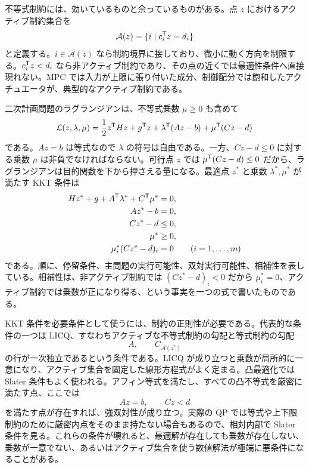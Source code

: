 不等式制約には、効いているものと余っているものがある。点 $z$ におけるアクティブ制約集合を
\begin{equation}
  \mathcal{A}(z)=\{i\mid c_i^{\mathsf{T}} z=d_i\}
\end{equation}
と定義する。$i\in\mathcal{A}(z)$ なら制約境界に接しており、微小に動く方向を制限する。$c_i^{\mathsf{T}} z<d_i$ なら非アクティブ制約であり、その点の近くでは最適性条件へ直接現れない。MPC では入力が上限に張り付いた成分、制御配分では飽和したアクチュエータが、典型的なアクティブ制約である。

二次計画問題のラグランジアンは、不等式乗数 $\mu\ge0$ も含めて
\begin{equation}
  \mathcal{L}(z,\lambda,\mu)
  =\frac{1}{2}z^{\mathsf{T}} Hz+g^{\mathsf{T}} z
  +\lambda^{\mathsf{T}}(Az-b)+\mu^{\mathsf{T}}(Cz-d)
\end{equation}
である。$Az=b$ は等式なので $\lambda$ の符号は自由である。一方、$Cz-d\le0$ に対する乗数 $\mu$ は非負でなければならない。可行点 $z$ では $\mu^{\mathsf{T}}(Cz-d)\le0$ だから、ラグランジアンは目的関数を下から押さえる量になる。最適点 $z^*$ と乗数 $\lambda^*,\mu^*$ が満たす KKT 条件は
\begin{align}
  Hz^*+g+A^{\mathsf{T}}\lambda^*+C^{\mathsf{T}}\mu^*&=0,\\
  Az^*-b&=0,\\
  Cz^*-d&\le0,\\
  \mu^*&\ge0,\\
  \mu_i^*(Cz^*-d)_i&=0\qquad (i=1,\ldots,m)
\end{align}
である。順に、停留条件、主問題の実行可能性、双対実行可能性、相補性を表している。相補性は、非アクティブ制約では $(Cz^*-d)_i<0$ だから $\mu_i^*=0$、アクティブ制約では乗数が正になり得る、という事実を一つの式で書いたものである。

KKT 条件を必要条件として使うには、制約の正則性が必要である。代表的な条件の一つは LICQ、すなわちアクティブな不等式制約の勾配と等式制約の勾配
\begin{equation}
  A,\qquad C_{\mathcal{A}(z^*)}
\end{equation}
の行が一次独立であるという条件である。LICQ が成り立つと乗数が局所的に一意になり、アクティブ集合を固定した線形方程式がよく定まる。凸最適化では Slater 条件もよく使われる。アフィン等式を満たし、すべての凸不等式を厳密に満たす点、ここでは
\begin{equation}
  Az=b,
  \qquad
  Cz<d
\end{equation}
を満たす点が存在すれば、強双対性が成り立つ。実際の QP では等式や上下限制約のために厳密内点をそのまま持たない場合もあるので、相対内部で Slater 条件を見る。これらの条件が壊れると、最適解が存在しても乗数が存在しない、乗数が一意でない、あるいはアクティブ集合を使う数値解法が極端に悪条件になることがある。

